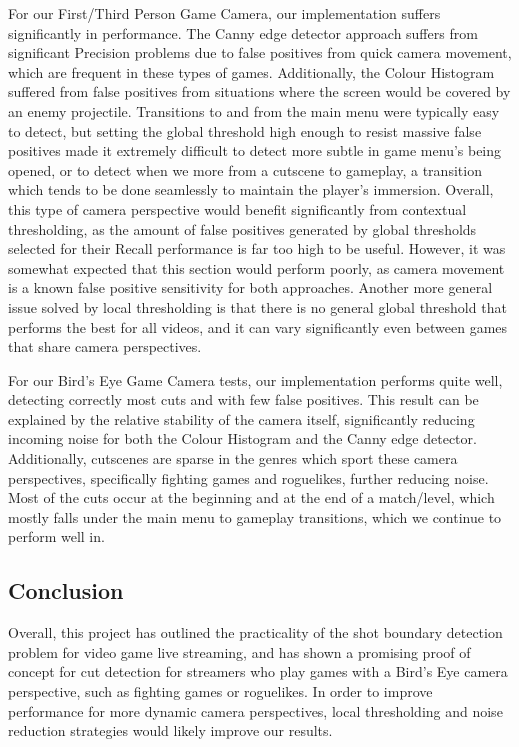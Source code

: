 \documentclass[12pt]{article}
\begin{document}
For our First/Third Person Game Camera, our implementation suffers significantly in performance. The Canny edge detector approach suffers from significant Precision problems 
due to false positives from quick camera movement, which are frequent in these types of games. Additionally, the Colour Histogram suffered from false positives from situations
where the screen would be covered by an enemy projectile. Transitions to and from the main menu were typically easy to detect, but setting the global threshold high enough to 
resist massive false positives made it extremely difficult to detect more subtle in game menu's being opened, or to detect when we more from a cutscene to gameplay, a transition
which tends to be done seamlessly to maintain the player's immersion. Overall, this type of camera perspective would benefit significantly from contextual thresholding, as the amount of false 
positives generated by global thresholds selected for their Recall performance is far too high to be useful. However, it was somewhat expected that this section would perform
poorly, as camera movement is a known false positive sensitivity for both approaches. Another more general issue solved by local thresholding is that there is no general 
global threshold that performs the best for all videos, and it can vary significantly even between games that share camera perspectives.

For our Bird's Eye Game Camera tests, our implementation performs quite well, detecting correctly most cuts and with few false positives. This result can be explained by the 
relative stability of the camera itself, significantly reducing incoming noise for both the Colour Histogram and the Canny edge detector. Additionally, cutscenes are sparse
in the genres which sport these camera perspectives, specifically fighting games and roguelikes, further reducing noise. Most of the cuts occur at the beginning and at the end 
of a match/level, which mostly falls under the main menu to gameplay transitions, which we continue to perform well in.
\subsection{Conclusion}
Overall, this project has outlined the practicality of the shot boundary detection problem for video game live streaming, and has 
shown a promising proof of concept for cut detection for streamers who play games with a Bird's Eye camera perspective, such as fighting games or 
roguelikes. In order to improve performance for more dynamic camera perspectives, local thresholding and noise reduction strategies would likely improve our results.
\clearpage

{}

\clearpage
\end{document}
